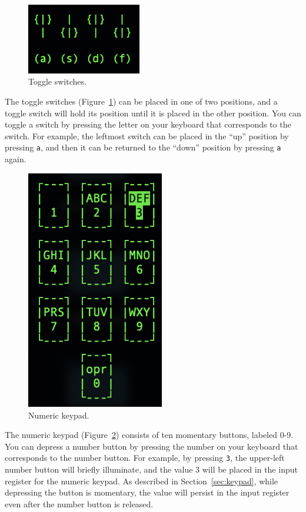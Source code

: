 \documentclass[12pt]{article}
\begin{document}
\begin{figure}
    \centering
    \includegraphics[width=5cm]{toggles}
    \caption{Toggle switches.\label{fig:toggles}}
\end{figure}

The toggle switches (Figure~\ref{fig:toggles}) can be placed in one of two
positions, and a toggle switch will hold its position until it is placed in the
other position. You can toggle a switch by pressing the letter on your keyboard
that corresponds to the switch. For example, the leftmost switch can be placed
in the ``up'' position by pressing \texttt{a}, and then it can be returned to
the ``down'' position by pressing \texttt{a} again.

\begin{figure}
    \centering
    \includegraphics[width=6cm]{keypad}
    \caption{Numeric keypad.\label{fig:keypad}}
\end{figure}

The numeric keypad (Figure~\ref{fig:keypad}) consists of ten momentary buttons,
labeled 0-9. You can depress a number button by pressing the number on your
keyboard that corresponds to the number button. For example, by pressing
\texttt{3}, the upper-left number button will briefly illuminate, and the value
$3$ will be placed in the input register for the numeric keypad. As described
in Section~\ref{sec:keypad}, while depressing the button is momentary, the
value will persist in the input register even after the number button is
released.
\end{document}
